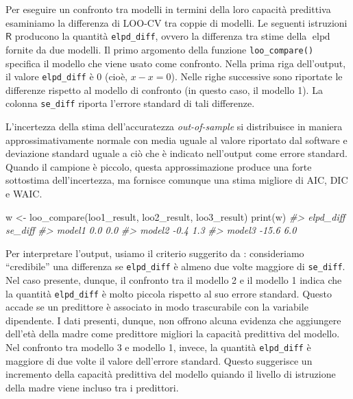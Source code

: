 \documentclass[
  10pt,
  italian,
  a4paper,
  extrafontsizes,onecolumn,openright
  ]{memoir}
\newenvironment{Shaded}{\begin{snugshade}}{\end{snugshade}}
\newcommand{\CommentTok}[1]{\textcolor[rgb]{0.56,0.35,0.01}{\textit{#1}}}
\newcommand{\FunctionTok}[1]{\textcolor[rgb]{0.00,0.00,0.00}{#1}}
\newcommand{\NormalTok}[1]{#1}
\newcommand{\OtherTok}[1]{\textcolor[rgb]{0.56,0.35,0.01}{#1}}
\DeclareMathOperator{\elpd}{elpd} %
\newcommand{\R}{\textsf{R}} %
\theoremstyle{definition}
\theoremstyle{definition}
\theoremstyle{definition}
\theoremstyle{definition}
\theoremstyle{remark}
\begin{document}
Per eseguire un confronto tra modelli in termini della loro capacità predittiva esaminiamo la differenza di LOO-CV tra coppie di modelli. Le seguenti istruzioni \(\R\) producono la quantità \texttt{elpd\_diff}, ovvero la differenza tra stime della \(\elpd\) fornite da due modelli. Il primo argomento della funzione \texttt{loo\_compare()} specifica il modello che viene usato come confronto. Nella prima riga dell'output, il valore \texttt{elpd\_diff} è 0 (cioè, \(x − x = 0\)). Nelle righe successive sono riportate le differenze rispetto al modello di confronto (in questo caso, il modello 1). La colonna \texttt{se\_diff} riporta l'errore standard di tali differenze.

L'incertezza della stima dell'accuratezza \emph{out-of-sample} si distribuisce in maniera approssimativamente normale con media uguale al valore riportato dal software e deviazione standard uguale a ciò che è indicato nell'output come errore standard. Quando il campione è piccolo, questa approssimazione produce una forte sottostima dell'incertezza, ma fornisce comunque una stima migliore di AIC, DIC e WAIC.

\begin{Shaded}
\begin{Highlighting}[]
\NormalTok{w }\OtherTok{\textless{}{-}} \FunctionTok{loo\_compare}\NormalTok{(loo1\_result, loo2\_result, loo3\_result)}
\FunctionTok{print}\NormalTok{(w)}
\CommentTok{\#\textgreater{}        elpd\_diff se\_diff}
\CommentTok{\#\textgreater{} model1   0.0       0.0  }
\CommentTok{\#\textgreater{} model2  {-}0.4       1.3  }
\CommentTok{\#\textgreater{} model3 {-}15.6       6.0}
\end{Highlighting}
\end{Shaded}

Per interpretare l'output, usiamo il criterio suggerito da \textcite{gelman1995bayesian}: consideriamo ``credibile'' una differenza se \texttt{elpd\_diff} è almeno due volte maggiore di \texttt{se\_diff}. Nel caso presente, dunque, il confronto tra il modello 2 e il modello 1 indica che la quantità \texttt{elpd\_diff} è molto piccola rispetto al suo errore standard.
Questo accade se un predittore è associato in modo trascurabile con la variabile dipendente. I dati presenti, dunque, non offrono alcuna evidenza che aggiungere dell'età della madre come predittore migliori la capacità predittiva del modello. Nel confronto tra modello 3 e modello 1, invece, la quantità \texttt{elpd\_diff} è maggiore di due volte il valore dell'errore standard. Questo suggerisce un incremento della capacità predittiva del modello quiando il livello di istruzione della madre viene incluso tra i predittori.
\end{document}
